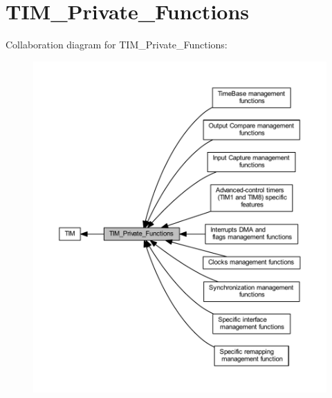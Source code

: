 \hypertarget{group___t_i_m___private___functions}{}\section{T\+I\+M\+\_\+\+Private\+\_\+\+Functions}
\label{group___t_i_m___private___functions}
Collaboration diagram for T\+I\+M\+\_\+\+Private\+\_\+\+Functions\+:
\nopagebreak
\begin{figure}[H]
\begin{center}
\leavevmode
\includegraphics[width=350pt]{group___t_i_m___private___functions}
\end{center}
\end{figure}
